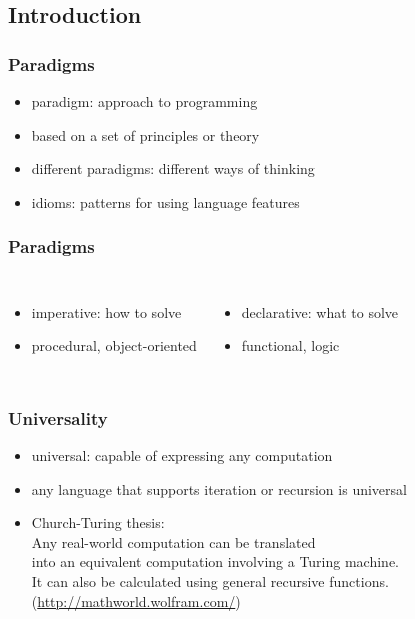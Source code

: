 \documentclass[dvipsnames]{beamer}
\theoremstyle{plain}
\begin{document}
\subsection{Introduction}

\begin{frame}
  \frametitle{Paradigms}

  \begin{itemize}
    \item \alert{paradigm}: approach to programming
    \item based on a set of principles or theory
    \item different paradigms: different ways of thinking

    \pause
    \bigskip
    \item \alert{idioms}: patterns for using language features
  \end{itemize}
\end{frame}

\begin{frame}
  \frametitle{Paradigms}

  \begin{columns}[t]
    \begin{itemize}
      \item \alert{imperative}: how to solve
      \item procedural, object-oriented
    \end{itemize}

    \begin{itemize}
      \item \alert{declarative}: what to solve
      \item functional, logic
    \end{itemize}
  \end{columns}
\end{frame}

\begin{frame}
  \frametitle{Universality}

  \begin{itemize}
    \item \alert{universal}: capable of expressing any computation
    \item any language that supports iteration or recursion is universal

    \pause
    \bigskip
    \item \alert{Church-Turing thesis}:\\
    \smallskip
    Any real-world computation can be translated\\
    into an equivalent computation involving a Turing machine.\\
    \medskip
    It can also be calculated using general recursive functions.\\
    \smallskip
    (\url{http://mathworld.wolfram.com/})
  \end{itemize}
\end{frame}
\end{document}
